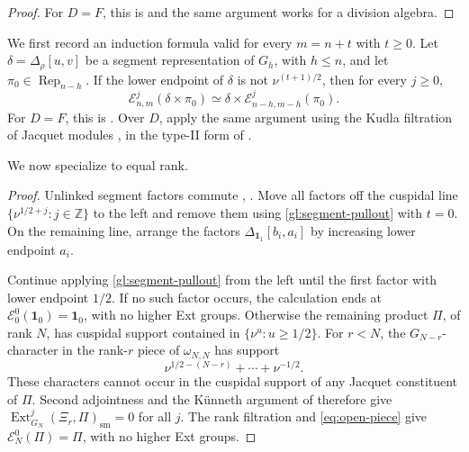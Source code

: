 \documentclass[10pt,a4paper]{article}
\newtheorem{lemma}[theorem]{Lemma}
\theoremstyle{definition}
\theoremstyle{remark}
\numberwithin{equation}{section}
\newcommand{\ZZ}{\mathbb{Z}}
\newcommand{\rep}{\operatorname{Rep}}
\newcommand{\fm}{\mathfrak{m}}
\newcommand{\fl}{\mathfrak{l}}
\newcommand{\St}{\operatorname{St}}
\newcommand{\bD}{D}
\newcommand{\cE}{\mathcal{E}}
\newcommand{\sm}{\mathrm{sm}}
\newcommand{\one}{\mathbf{1}}
\DeclareMathOperator{\Ext}{Ext}
\newcommand{\De}{\Delta}
\begin{document}
\begin{proof}
For $D=F$, this is
\cite[Theorem~5.13 and Proposition~5.17]{APS2017} and the same argument works for a division algebra.
\end{proof}
We first record an induction formula valid for every $m=n+t$ with
$t\geq0$. Let $\delta=\De_\rho[u,v]$ be a segment representation
of $G_h$, with $h\leq n$, and let $\pi_0\in\rep_{n-h}$.
If the lower endpoint of $\delta$ is not $\nu^{(t+1)/2}$, then
for every $j\geq0$,
\begin{equation}\label{gl:segment-pullout}
 \cE^j_{n,m}(\delta\times\pi_0)
 \simeq\delta\times\cE^j_{n-h,m-h}(\pi_0).
\end{equation}
For $D=F$, this is \cite[Corollary~3.5]{CLLTZ2025}.
Over $D$, apply the same argument using the Kudla filtration of
Jacquet modules \cite{Kudla1986}, in the type-II form of
\cite[Proposition~3.2]{Minguez2008}.

We now specialize to equal rank.
\begin{proof}
Unlinked segment factors commute
\cite[Theorem~9.7(a)]{Zelevinsky1980},
\cite[\S3.1 and Theorem~3.8]{RegularLM2018}.
Move all factors off the cuspidal line
$\{\nu^{1/2+j}:j\in\ZZ\}$ to the left and remove them using
\eqref{gl:segment-pullout} with $t=0$.
On the remaining line, arrange the factors
$\De_{\one_1}[b_i,a_i]$ by increasing lower endpoint $a_i$.

Continue applying \eqref{gl:segment-pullout} from the left until
the first factor with lower endpoint $1/2$. If no such factor occurs,
the calculation ends at $\cE^0_0(\one_0)=\one_0$, with no higher
Ext groups. Otherwise the remaining product $\Pi$, of rank $N$,
has cuspidal support contained in $\{\nu^u:u\geq1/2\}$.
For $r<N$, the $G_{N-r}$-character in the rank-$r$ piece of
$\omega_{N,N}$ has support
\[
 \nu^{1/2-(N-r)}+\cdots+\nu^{-1/2}.
\]
These characters cannot occur in the cuspidal support of any
Jacquet constituent of $\Pi$. Second adjointness and the K\"unneth argument
of \cite[\S3.3]{CLLTZ2025} therefore give
$\Ext^j_{G_N}(\Xi_r,\Pi)_\sm=0$ for all $j$.
The rank filtration and \eqref{eq:open-piece} give
$\cE^0_N(\Pi)=\Pi$, with no higher Ext groups.
\end{proof}
\end{document}
